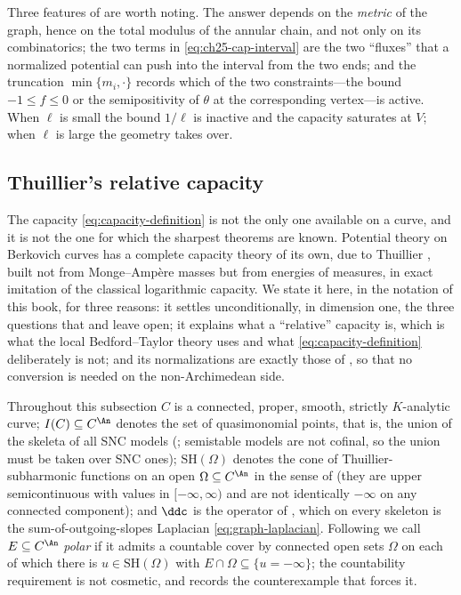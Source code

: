 \begin{remark}
\label{rem:ch25-segment-reading}
Three features of  are worth noting.  The
answer depends on the \emph{metric} of the graph, hence on the total modulus
of the annular chain, and not only on its combinatorics; the two terms in
\eqref{eq:ch25-cap-interval} are the two ``fluxes'' that a normalized
potential can push into the interval from the two ends; and the truncation
$\min\{m_i,\cdot\}$ records which of the two constraints---the bound
$-1\leq f\leq0$ or the semipositivity of $\theta$ at the corresponding
vertex---is active.  When $\ell$ is small the bound $1/\ell$ is inactive
and the capacity saturates at $V$; when $\ell$ is large the geometry
takes over.
\end{remark}

\subsection{Thuillier's relative capacity}
\label{sec:ch25-thuillier}

The capacity \eqref{eq:capacity-definition} is not the only one available on
a curve, and it is not the one for which the sharpest theorems are known.
Potential theory on Berkovich curves has a complete capacity theory of its
own, due to Thuillier \cite{Thu05}, built not from Monge--Amp\`ere masses but
from energies of measures, in exact imitation of the classical logarithmic
capacity.  We state it here, in the notation of this book, for three
reasons: it settles unconditionally, in dimension one, the three questions
that  and
 leave open; it explains what a
``relative'' capacity is, which is what the local Bedford--Taylor theory
uses and what \eqref{eq:capacity-definition} deliberately is not; and its
normalizations are exactly those of , so that no
conversion is needed on the non-Archimedean side.

Throughout this subsection $C$ is a connected, proper, smooth, strictly
$K$-analytic curve; $I(C)\subseteq C^{\An}$ denotes the set of
quasimonomial points, that is, the union of the skeleta of all SNC
models (; semistable models are not
cofinal, so the union must be taken over SNC ones); $\mathrm{SH}(\Omega)$ denotes the
cone of Thuillier-subharmonic functions on an open $\Omega\subseteq C^{\An}$
in the sense of  (they are upper semicontinuous with
values in $[-\infty,\infty)$ and are not identically $-\infty$ on any
connected component); and $\ddc$ is the operator of
, which on every skeleton is the sum-of-outgoing-slopes
Laplacian \eqref{eq:graph-laplacian}.  Following \cite{Thu05} we call
$E\subseteq C^{\An}$ \emph{polar} if it admits a countable cover by
connected open sets $\Omega$ on each of which there is
$u\in\mathrm{SH}(\Omega)$ with $E\cap\Omega\subseteq\{u=-\infty\}$; the
countability requirement is not cosmetic, and
 records the counterexample that forces it.

